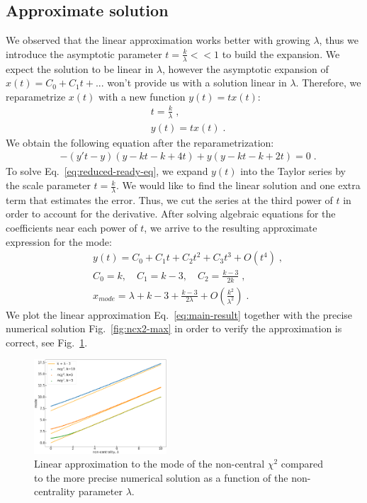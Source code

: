 \documentclass[final,5p,twocolumn,preprint,nopreprintline,times,authoryear]{elsarticle}
\begin{document}
\subsection{Approximate solution}
We observed that the linear approximation works better with growing $\lambda$, thus we introduce the asymptotic parameter $t = \frac{k}{\lambda} << 1$ to build the expansion. We expect the solution to be linear in $\lambda$, however the asymptotic expansion of $x(t) = C_0 + C_1 t + ...$ won't provide us with a solution linear in $\lambda$. Therefore, we reparametrize $x(t)$ with a new function $y(t) = t x(t)$:
%
\begin{align}
    &t = \frac{k}{\lambda}\;,\label{eq:asymp-scale} \\
    &y(t) = t x(t)\;.
\end{align}
%
We obtain the following equation after the reparametrization:
%
\begin{align}
   &-(y' t - y) (y - kt - k + 4t) + y (y - kt - k + 2t) = 0\label{eq:reduced-ready-eq}\;.
\end{align}
%
To solve Eq.~\ref{eq:reduced-ready-eq}, we expand $y(t)$ into the Taylor series by the scale parameter $t = \frac{k}{\lambda}$. We would like to find the linear solution and one extra term that estimates the error. Thus, we cut the series at the third power of $t$ in order to account for the derivative. After solving algebraic equations for the coefficients near each power of $t$, we arrive to the resulting approximate expression for the mode:
%
\begin{align}
    &y(t) = C_0 + C_1 t + C_2 t^2 + C_3 t^3 + O(t^4)\;, \\
    &C_0 = k, \quad C_1 = k-3, \quad C_2 = \frac{k-3}{2k}\;,\label{eq:taylor-coef-sols}\\
    &\boxed{x_{mode} = \lambda + k - 3 + \frac{k-3}{2 \lambda} + O\left(\frac{k^2}{\lambda^2}\right)} \label{eq:main-result}\;.
\end{align}
%
We plot the linear approximation Eq.~\ref{eq:main-result} together with the precise numerical solution Fig.~\ref{fig:ncx2-max} in order to verify the approximation is correct, see Fig.~\ref{fig:ncx2-vs-approx}.

\begin{figure}[h]
	\centering
 	\includegraphics[width=0.44\textwidth]{ncx2-vs-approx.png}
	\caption{Linear approximation to the mode of the non-central $\chi^2$ compared to the more precise numerical solution as a function of the non-centrality parameter $\lambda$.}\label{fig:ncx2-vs-approx}
\end{figure}
\end{document}
